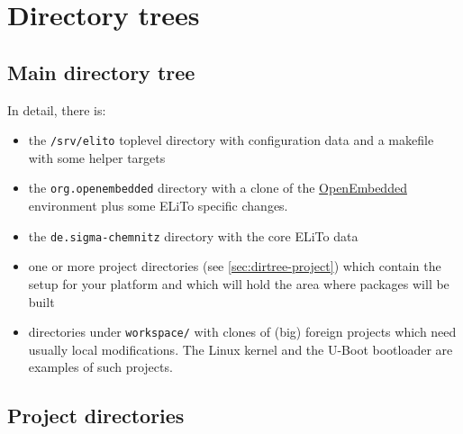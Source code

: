 \chapter{\label{app:dirtree}Directory trees}

\section{Main directory tree}
\label{sec:dirtree-main}

\vspace{1em}

In detail, there is:
\begin{itemize}
\item the \texttt{/srv/elito} toplevel directory with configuration
  data and a makefile with some helper targets
\item the \texttt{org.openembedded} directory with a clone of the
  \href{http://www.openembedded.org}{OpenEmbedded} environment plus
  some ELiTo specific changes.
\item the \texttt{de.sigma-chemnitz} directory with the core ELiTo
  data
\item one or more project directories (see
  \autoref{sec:dirtree-project}) which contain the setup for your
  platform and which will hold the area where packages will be built
\item directories under \texttt{workspace/} with clones of (big)
  foreign projects which need usually local modifications. The Linux
  kernel and the U-Boot bootloader are examples of such projects.
\end{itemize}

\section{Project directories}
\label{sec:dirtree-project}

